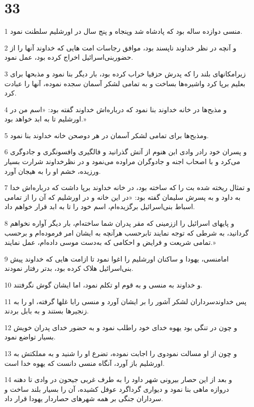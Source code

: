 \chapter{33}

\par 1 منسی دوازده ساله بود که پادشاه شد وپنجاه و پنج سال در اورشلیم سلطنت نمود.
\par 2 و آنچه در نظر خداوند ناپسند بود، موافق رجاسات امت هایی که خداوند آنها را از حضوربنی‌اسرائیل اخراج کرده بود، عمل نمود.
\par 3 زیرامکانهای بلند را که پدرش حزقیا خراب کرده بود، بار دیگر بنا نمود و مذبحها برای بعلیم برپا کرد واشیره‌ها بساخت و به تمامی لشکر آسمان سجده نموده، آنها را عبادت کرد.
\par 4 و مذبح‌ها در خانه خداوند بنا نمود که درباره‌اش خداوند گفته بود: «اسم من در اورشلیم تا به ابد خواهد بود.»
\par 5 ومذبح‌ها برای تمامی لشکر آسمان در هر دوصحن خانه خداوند بنا نمود.
\par 6 و پسران خود رادر وادی ابن هنوم از آتش گذرانید و فالگیری وافسونگری و جادوگری می‌کرد و با اصحاب اجنه و جادوگران مراوده می‌نمود و در نظرخداوند شرارت بسیار ورزیده، خشم او را به هیجان آورد.
\par 7 و تمثال ریخته شده بت را که ساخته بود، در خانه خداوند برپا داشت که درباره‌اش خدا به داود و به پسرش سلیمان گفته بود: «در این خانه و در اورشلیم که آن را از تمامی اسباط بنی‌اسرائیل برگزیده‌ام، اسم خود را تا به ابد قرار خواهم داد.
\par 8 و پایهای اسرائیل را اززمینی که مقر پدران شما ساخته‌ام، بار دیگر آواره نخواهم گردانید، به شرطی که توجه نمایند تابرحسب هر‌آنچه به ایشان امر فرموده‌ام و برحسب تمامی شریعت و فرایض و احکامی که به‌دست موسی داده‌ام، عمل نمایند.»
\par 9 امامنسی، یهودا و ساکنان اورشلیم را اغوا نمود تا ازامت هایی که خداوند پیش بنی‌اسرائیل هلاک کرده بود، بدتر رفتار نمودند.
\par 10 و خداوند به منسی و به قوم او تکلم نمود، اما ایشان گوش نگرفتند.
\par 11 پس خداوندسرداران لشکر آشور را بر ایشان آورد و منسی رابا غلها گرفته، او را به زنجیرها بستند و به بابل بردند.
\par 12 و چون در تنگی بود یهوه خدای خود راطلب نمود و به حضور خدای پدران خویش بسیار تواضع نمود.
\par 13 و چون از او مسالت نمودوی را اجابت نموده، تضرع او را شنید و به مملکتش به اورشلیم باز آورد، آنگاه منسی دانست که یهوه خدا است.
\par 14 و بعد از این حصار بیرونی شهر داود را به طرف غربی جیحون در وادی تا دهنه دروازه ماهی بنا نمود و دیواری گرداگرد عوفل کشیده، آن را بسیار بلند ساخت و سرداران جنگی بر همه شهرهای حصاردار یهودا قرار داد.
